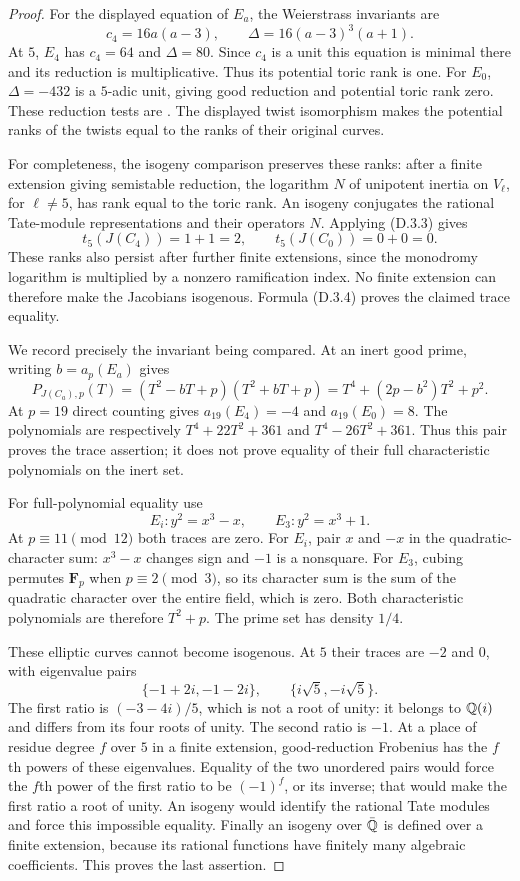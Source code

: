 \begin{proof}
For the displayed equation of $E_a$, the Weierstrass invariants
are
\[
 c_4=16a(a-3),\qquad
 \Delta=16(a-3)^3(a+1).
 \tag{D.3.5}
\]
At $5$, $E_4$ has $c_4=64$ and $\Delta=80$. Since $c_4$ is a
unit this equation is minimal there and its reduction is
multiplicative. Thus its potential toric rank is one.
For $E_0$, $\Delta=-432$ is a $5$-adic unit, giving good
reduction and potential toric rank zero. These reduction tests
are \cite[II, \S3]{AgentMilneEC}. The displayed twist
isomorphism makes the potential ranks of the twists equal to
the ranks of their original curves.

For completeness, the isogeny comparison preserves these
ranks: after a finite extension giving semistable reduction,
the logarithm $N$ of unipotent inertia on $V_\ell$, for
$\ell\ne5$, has rank equal to the toric rank. An isogeny
conjugates the rational Tate-module representations and their
operators $N$. Applying (D.3.3) gives
\[
 t_5(J(C_4))=1+1=2,\qquad t_5(J(C_0))=0+0=0.
 \tag{D.3.6}
\]
These ranks also persist after further finite extensions, since
the monodromy logarithm is multiplied by a nonzero ramification
index. No finite extension can therefore make the Jacobians
isogenous. Formula (D.3.4) proves the claimed trace equality.

We record precisely the invariant being compared. At an inert
good prime, writing $b=a_p(E_a)$ gives
\[
 P_{J(C_a),p}(T)
  =(T^2-bT+p)(T^2+bT+p)
  =T^4+(2p-b^2)T^2+p^2.
 \tag{D.3.7}
\]
At $p=19$ direct counting gives $a_{19}(E_4)=-4$ and
$a_{19}(E_0)=8$. The polynomials are respectively
$T^4+22T^2+361$ and $T^4-26T^2+361$.
Thus this pair proves the trace assertion; it does not prove
equality of their full characteristic polynomials on the inert
set.

For full-polynomial equality use
\[
 E_i:y^2=x^3-x,
 \qquad E_3:y^2=x^3+1.
 \tag{D.3.8}
\]
At $p\equiv11\pmod{12}$ both traces are zero. For $E_i$, pair
$x$ and $-x$ in the quadratic-character sum: $x^3-x$ changes
sign and $-1$ is a nonsquare. For $E_3$, cubing permutes
$\mathbf F_p$ when $p\equiv2\pmod3$, so its character sum is
the sum of the quadratic character over the entire field,
which is zero. Both characteristic polynomials are therefore
$T^2+p$. The prime set has density $1/4$.

These elliptic curves cannot become isogenous. At $5$ their
traces are $-2$ and $0$, with eigenvalue pairs
\[
 \{-1+2i,-1-2i\},\qquad
 \{i\sqrt5,-i\sqrt5\}.
\]
The first ratio is $(-3-4i)/5$, which is not a root of unity:
it belongs to $\mathbb Q(i)$ and differs from its four roots of unity.
The second ratio is $-1$. At a place of residue degree $f$
over $5$ in a finite extension, good-reduction Frobenius has
the $f$th powers of these eigenvalues. Equality of the two
unordered pairs would force the $f$th power of the first
ratio to be $(-1)^f$, or its inverse; that would make the first
ratio a root of unity. An isogeny would identify the rational
Tate modules and force this impossible equality. Finally an
isogeny over $\bar{\mathbb Q}$ is defined over a finite extension,
because its rational functions have finitely many algebraic
coefficients. This proves the last assertion.
\end{proof}

